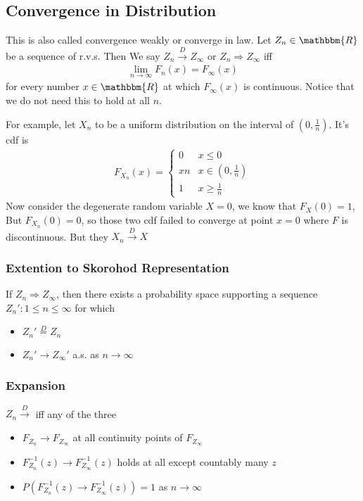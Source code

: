 \subsection{Convergence in Distribution} 
This is also called convergence weakly or converge in law. Let  $Z_n \in \mathbbm{R}$ be a sequence of r.v.s. Then We say $Z_n \overset{D}{\to} Z_\infty$ or $Z_n \Rightarrow Z_\infty$ iff
    \begin{align*}
        \lim_{n \to \infty} F_n(x) = F_\infty(x)
    \end{align*}
for every number $x\in \mathbbm{R}$ at which $F_\infty(x)$ is continuous. 
Notice that we do not need this to hold at all $n$. 

For example, let $X_n$ to be a uniform distribution on the interval of $(0, \frac{1}{n})$. It's cdf is 
    \begin{align*}
        F_{X_n}(x) = 
        \begin{cases}
        0 & x \leq 0 \\
        x n & x \in (0, \frac{1}{n}) \\
        1 & x \geq \frac{1}{n}
        \end{cases}
    \end{align*}
Now consider the degenerate random variable $X = 0$, we know that $F_X(0) = 1$, But $F_{X_n}(0)=0$, so those two cdf failed to converge at point $x=0$ where $F$ is discontinuous. But they $X_n \overset{D}{\to} X$


\subsubsection{Extention to Skorohod Representation}
If $Z_n \Rightarrow Z_\infty$, then there exists a probability space supporting a sequence $Z_n': 1 \leq n \leq \infty$ for which 
    \begin{itemize}
        \item $Z_n' \overset{D}{=} Z_n$ 
        \item $Z_n' \to Z_\infty'$ a.s. as $n \to \infty$
    \end{itemize}


\subsubsection{Expansion}
$Z_n \overset{D}{\to}$ iff any of the three
    \begin{itemize}
        \item $F_{Z_n} \to F_{Z_\infty}$ at all continuity points of $F_{Z_\infty}$
        \item $F_{Z_n}^{-1}(z) \to F_{Z_\infty}^{-1}(z)$  holds at all except countably many $z$
        \item $P(F_{Z_n}^{-1}(z) \to F_{Z_\infty}^{-1}(z)) = 1$ as $n \to \infty$
    \end{itemize}

